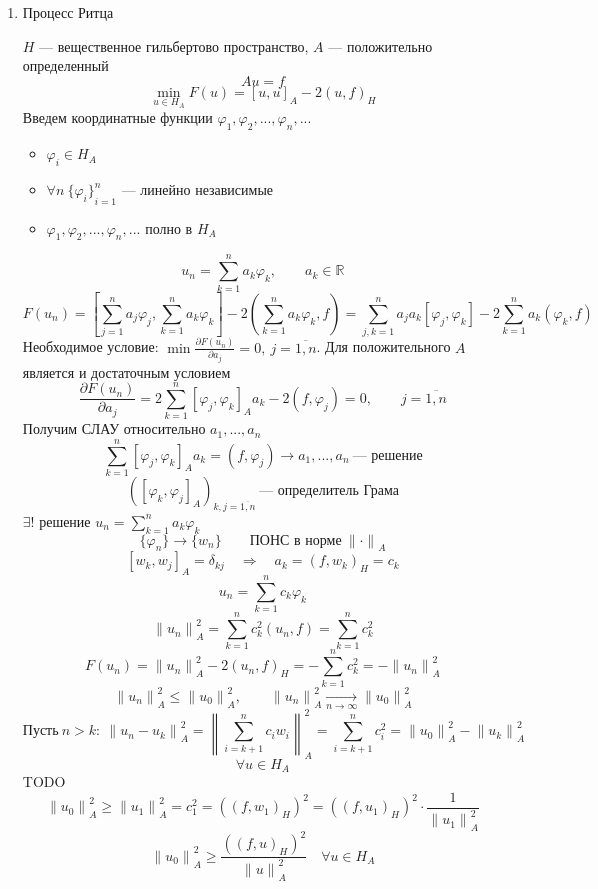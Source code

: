 \documentclass[12pt, a4paper]{article}
\newcommand{\Sum}{\sum\limits}
\begin{document}
\begin{enumerate}
	\item Процесс Ритца
	
	$H$ --- вещественное гильбертово пространство, $A$ --- положительно определенный
	\[ Au = f \]
	\[ \underset{u \in H_A}{\min} F(u) = {[u,u]}_A - 2{(u,f)}_H \]
	Введем координатные функции $ \varphi_1, \varphi_2, ..., \varphi_n, ... $
	\begin{itemize}
		\item $ \varphi_i \in H_A $
		\item $ \forall n \ {\{ \varphi_i \}}^n_{i=1} $ --- линейно независимые
		\item $ \varphi_1, \varphi_2, ..., \varphi_n, ... $ полно в $H_A$
	\end{itemize}
	\[u_n = \Sum_{k=1}^n a_k \varphi_k, \qquad a_k \in \mathbb{R} \]
	\[ F(u_n) = {\left[\Sum_{j=1}^n a_j \varphi_j, \Sum_{k=1}^n a_k \varphi_k \right]} - 2{\left(\Sum_{k=1}^n a_k \varphi_k, f \right)} = \Sum_{j,k=1}^n a_j a_k {[\varphi_j, \varphi_k]} - 2 \Sum_{k=1}^n a_k {(\varphi_k, f)} \]
	Необходимое условие: $ \min \frac{\partial F(u_n)}{\partial a_j} = 0, \ j=\overline{1,n} $. Для положительного $A$ является и достаточным условием
	\[ \frac{\partial F(u_n)}{\partial a_j} = 2 \Sum_{k=1}^n {[\varphi_j, \varphi_k]}_A a_k - 2 {(f, \varphi_j)} = 0, \qquad j=\overline{1,n} \]
	Получим СЛАУ относительно $ a_1,..., a_n $
	\[ \Sum_{k=1}^n {[\varphi_j, \varphi_k]}_A a_k = {(f, \varphi_j)} \rightarrow a_1,...,a_n \ \text{--- решение} \]
	\[ {\left( {[\varphi_k, \varphi_j]}_A \right)}_{k,j=\overline{1,n}} \ \text{--- определитель Грама} \]
	$ \exists ! $ решение $u_n = \Sum_{k=1}^n a_k \varphi_k $
	\[ \{ \varphi_n \} \rightarrow \{ w_n \} \qquad \text{ПОНС в норме} \ {\| \cdot \|}_A \]
	\[ {[w_k, w_j]}_A = \delta_{kj} \quad \Rightarrow \quad a_k = {(f, w_k)}_H = c_k \]
	\[ u_n = \Sum_{k=1}^n c_k \varphi_k \]
	\[ {\| u_n \|}^2_A = \Sum_{k=1}^n c_k^2 {(u_n, f)} = \Sum_{k=1}^n c_k^2 \]
	\[ F(u_n) = {\| u_n \|}^2_A - 2{(u_n, f)}_H = - \Sum_{k=1}^n c_k^2 = - {\| u_n \|}^2_A \]
	\[ {\| u_n \|}^2_A \leq {\| u_0 \|}^2_A, \qquad {\| u_n \|}^2_A \underset{n \rightarrow \infty}{\rightarrow} {\| u_0 \|}^2_A \]
	\[ \text{Пусть} \ n>k: \ {\| u_n - u_k \|}^2_A = {\left\lVert \Sum_{i=k+1}^n c_i w_i \right\rVert}^2_A = \Sum_{i=k+1}^n c_i^2 = {\| u_0 \|}^2_A - {\| u_k \|}^2_A \]
	\[ \forall u \in H_A \]
	TODO
	\[ {\| u_0 \|}^2_A \geq {\| u_1 \|}^2_A = c_1^2 = {({(f, w_1)}_H)}^2 = {({(f, u_1)}_H)}^2 \cdot \frac{1}{{\| u_1 \|}^2_A} \]
	\[ {\| u_0 \|}^2_A \geq \frac{{({(f, u)}_H)}^2}{{\| u \|}^2_A} \quad \forall u \in H_A \]
	

\end{enumerate}
\end{document}
